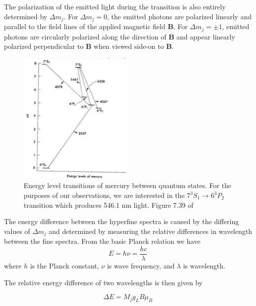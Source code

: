\documentclass[twocolumn]{article}
\begin{document}
		The polarization of the emitted light during the transition is also entirely determined by $\Delta m_j$.
		For $\Delta m_j = 0$, the emitted photons are polarized linearly and parallel to the field lines of the applied magnetic field $\mathbf{B}$.
		For $\Delta m_j=\pm1$, emitted photons are circularly polarized along the direction of $\mathbf{B}$ and appear linearly polarized perpendicular to $\mathbf{B}$ when viewed side-on to $\mathbf{B}$.
		\begin{figure}
			\centering
			\includegraphics[width=0.5\textwidth]{Images/MercuryEnergyLevelsDiagram.png}
			\caption{Energy level transitions of mercury between quantum states. For the purposes of our observations, we are interested in the $7^3S_1 \rightarrow 6^3P_2$ transition which produces 546.1 nm light. Figure 7.39 of \cite{melissinos_experiments_1966}}
			\label{fig:MercuryEnergyLevelsDiagram}
		\end{figure}
		
		The energy difference between the hyperfine spectra is caused by the differing values of $\Delta m_j$ and determined by measuring the relative differences in wavelength between the fine spectra.
		From the basic Planck relation we have
		\begin{equation}
			E = h\nu = \frac{hc}{\lambda}
		\end{equation}
		where $h$ is the Planck constant, $\nu$ is wave frequency, and $\lambda$ is wavelength.
		
		The relative energy difference of two wavelengths is then given by
		
		
		
		\begin{equation}
			\Delta E = M_j g_L B \mu_B
			\label{eq:EnergyShift}
		\end{equation}
		
\end{document}

